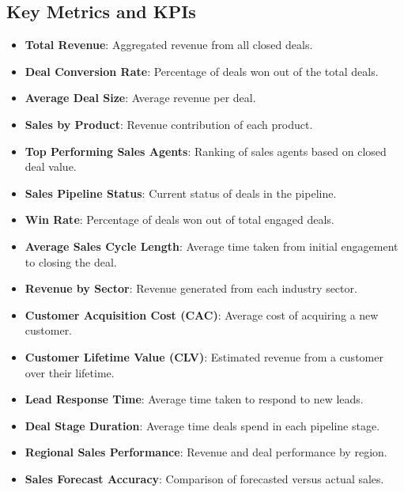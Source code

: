 \documentclass{article}
\begin{document}
\subsection{Key Metrics and KPIs}
\begin{itemize}
    \item \textbf{Total Revenue}: Aggregated revenue from all closed deals.
    \item \textbf{Deal Conversion Rate}: Percentage of deals won out of the total deals.
    \item \textbf{Average Deal Size}: Average revenue per deal.
    \item \textbf{Sales by Product}: Revenue contribution of each product.
    \item \textbf{Top Performing Sales Agents}: Ranking of sales agents based on closed deal value.
    \item \textbf{Sales Pipeline Status}: Current status of deals in the pipeline.
    \item \textbf{Win Rate}: Percentage of deals won out of total engaged deals.
    \item \textbf{Average Sales Cycle Length}: Average time taken from initial engagement to closing the deal.
    \item \textbf{Revenue by Sector}: Revenue generated from each industry sector.
    \item \textbf{Customer Acquisition Cost (CAC)}: Average cost of acquiring a new customer.
    \item \textbf{Customer Lifetime Value (CLV)}: Estimated revenue from a customer over their lifetime.
    \item \textbf{Lead Response Time}: Average time taken to respond to new leads.
    \item \textbf{Deal Stage Duration}: Average time deals spend in each pipeline stage.
    \item \textbf{Regional Sales Performance}: Revenue and deal performance by region.
    \item \textbf{Sales Forecast Accuracy}: Comparison of forecasted versus actual sales.
\end{itemize}
\end{document}
